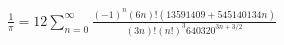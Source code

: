 \documentclass[preview]{standalone}
\begin{document}
\begin{align*}
\frac{1}{\pi} = 12 \sum_{n=0}^{\infty} \frac{(-1)^n (6n)! (13591409 + 545140134n)}{(3n)! (n!)^3 640320^{3n + 3/2}}
\end{align*}
\end{document}
